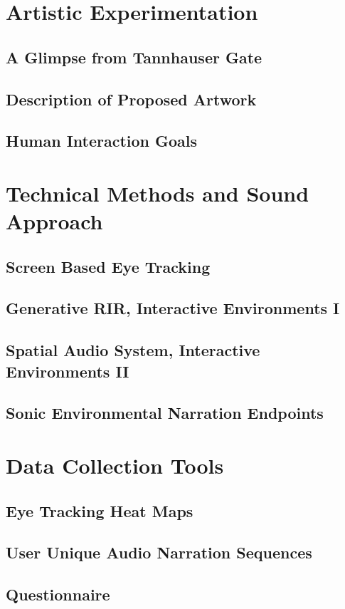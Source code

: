 \documentclass[a4paper, 12pt]{report}
\begin{document}
    \section{Artistic Experimentation}
        \subsection{A Glimpse from Tannhauser Gate}
        \subsection{Description of Proposed Artwork}
        \subsection{Human Interaction Goals}
    \section{Technical Methods and Sound Approach}
        \subsection{Screen Based Eye Tracking}
        \subsection{Generative RIR, Interactive Environments I}
        \subsection{Spatial Audio System, Interactive Environments II}
        \subsection{Sonic Environmental Narration Endpoints}
    \section{Data Collection Tools}
        \subsection{Eye Tracking Heat Maps}
        \subsection{User Unique Audio Narration Sequences}
        \subsection{Questionnaire}
\end{document}
